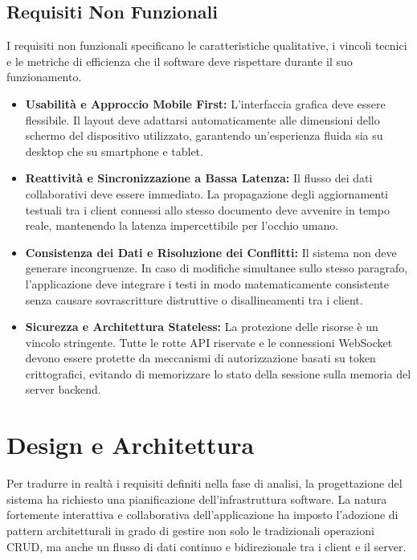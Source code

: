 \documentclass[11pt,a4paper]{report}
\begin{document}
\section{Requisiti Non Funzionali}
I requisiti non funzionali specificano le caratteristiche qualitative, i vincoli tecnici e le metriche di efficienza che il software deve rispettare durante il suo funzionamento.

\begin{itemize}
    \item \textbf{Usabilità e Approccio Mobile First:} L'interfaccia grafica deve essere flessibile. Il layout deve adattarsi automaticamente alle dimensioni dello schermo del dispositivo utilizzato, garantendo un'esperienza fluida sia su desktop che su smartphone e tablet.
    \item \textbf{Reattività e Sincronizzazione a Bassa Latenza:} Il flusso dei dati collaborativi deve essere immediato. La propagazione degli aggiornamenti testuali tra i client connessi allo stesso documento deve avvenire in tempo reale, mantenendo la latenza impercettibile per l'occhio umano.
    \item \textbf{Consistenza dei Dati e Risoluzione dei Conflitti:} Il sistema non deve generare incongruenze. In caso di modifiche simultanee sullo stesso paragrafo, l'applicazione deve integrare i testi in modo matematicamente consistente senza causare sovrascritture distruttive o disallineamenti tra i client.
    \item \textbf{Sicurezza e Architettura Stateless:} La protezione delle risorse è un vincolo stringente. Tutte le rotte API riservate e le connessioni WebSocket devono essere protette da meccanismi di autorizzazione basati su token crittografici, evitando di memorizzare lo stato della sessione sulla memoria del server backend.
\end{itemize}

\chapter{Design e Architettura}

Per tradurre in realtà i requisiti definiti nella fase di analisi, la progettazione del sistema ha richiesto una pianificazione dell'infrastruttura software. La natura fortemente interattiva e collaborativa dell'applicazione ha imposto l'adozione di pattern architetturali in grado di gestire non solo le tradizionali operazioni CRUD, ma anche un flusso di dati continuo e bidirezionale tra i client e il server.
\end{document}
